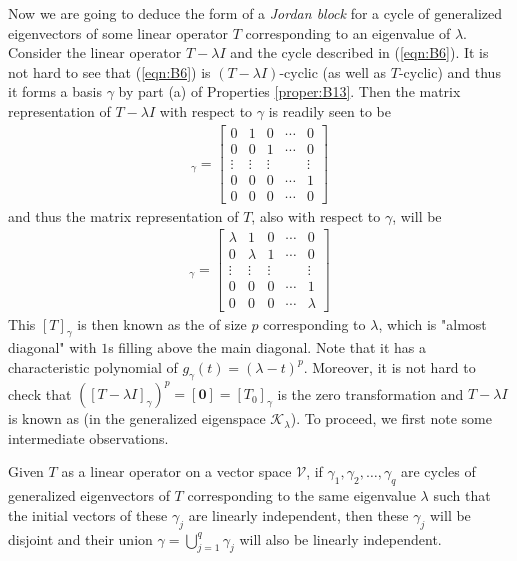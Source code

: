 Now we are going to deduce the form of a \textit{Jordan block} for a cycle of generalized eigenvectors of some linear operator $T$ corresponding to an eigenvalue of $\lambda$. Consider the linear operator $T-\lambda I$ and the cycle described in (\ref{eqn:B6}). It is not hard to see that (\ref{eqn:B6}) is $(T-\lambda I)$-cyclic (as well as $T$-cyclic) and thus it forms a basis $\gamma$ by part (a) of Properties \ref{proper:B13}. Then the matrix representation of $T-\lambda I$ with respect to $\gamma$ is readily seen to be
\begin{align}
[T-\lambda I]_\gamma = 
\begin{bmatrix}
0 & 1 & 0 & \cdots & 0 \\
0 & 0 & 1 & \cdots & 0 \\
\vdots & \vdots & \vdots & & \vdots \\
0 & 0 & 0 & \cdots & 1 \\
0 & 0 & 0 & \cdots & 0
\end{bmatrix}
\end{align}
and thus the matrix representation of $T$, also with respect to $\gamma$, will be
\begin{align}
[T]_\gamma = 
\begin{bmatrix}
\lambda & 1 & 0 & \cdots & 0 \\
0 & \lambda  & 1 & \cdots & 0 \\
\vdots & \vdots & \vdots & & \vdots \\
0 & 0 & 0 & \cdots & 1 \\
0 & 0 & 0 & \cdots & \lambda 
\end{bmatrix} 
\label{eqn:B8}
\end{align}
This $[T]_\gamma$ is then known as the  of size $p$ corresponding to $\lambda$, which is "almost diagonal" with $1$s filling above the main diagonal. Note that it has a characteristic polynomial of $g_\gamma(t) = (\lambda-t)^p$. Moreover, it is not hard to check that $([T-\lambda I]_\gamma)^p = [\textbf{0}] = [T_0]_\gamma$ is the zero transformation and $T-\lambda I$ is known as  (in the generalized eigenspace $\mathcal{K}_\lambda$). To proceed, we first note some intermediate observations.
\begin{thm}
Given $T$ as a linear operator on a vector space $\mathcal{V}$, if $\gamma_1, \gamma_2, \ldots, \gamma_q$ are cycles of generalized eigenvectors of $T$ corresponding to the same eigenvalue $\lambda$ such that the initial vectors of these $\gamma_j$ are linearly independent, then these $\gamma_j$ will be disjoint and their union $\gamma = \bigcup_{j=1}^{q} \gamma_j$ will also be linearly independent.
\end{thm}
